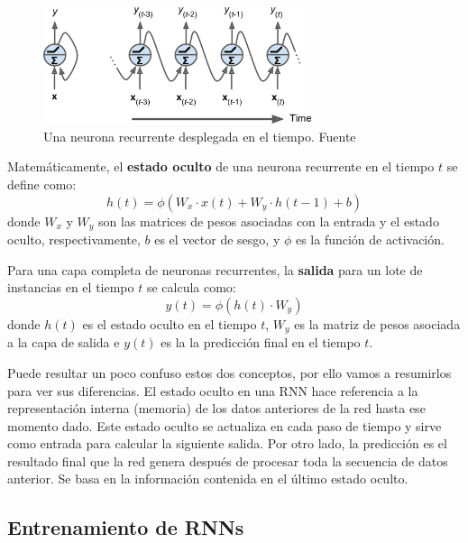 \begin{figure}[h]
    \centering
    \includegraphics[width=0.7\textwidth]{img/simple_RNN.png}
    \caption{Una neurona recurrente desplegada en el tiempo. Fuente \citep{geron2022hands}}
    \label{fig:rnn}
\end{figure}

Matemáticamente, el \textbf{estado oculto} de una neurona recurrente en el tiempo \( t \) se define como:
\begin{equation}
    h(t) = \phi ( W_x \cdot x(t) + W_y \cdot h(t-1) + b )
\end{equation}
donde \( W_x \) y \( W_y \) son las matrices de pesos asociadas con la entrada y el estado oculto, respectivamente, \( b \) es el vector de sesgo, y \( \phi \) es la función de activación.

Para una capa completa de neuronas recurrentes, la \textbf{salida} para un lote de instancias en el tiempo \( t \) se calcula como:
\begin{equation}
    y(t) = \phi(h(t) \cdot W_y)
\end{equation}
donde \( h(t) \) es el estado oculto en el tiempo $t$, $W_y$ es la matriz de pesos asociada a la capa de salida e $y(t)$ es la la predicción final en el tiempo $t$.

Puede resultar un poco confuso estos dos conceptos, por ello vamos a resumirlos para ver sus diferencias. El estado oculto en una RNN hace referencia a la representación interna (memoria) de los datos anteriores de la red hasta ese momento dado. Este estado oculto se actualiza en cada paso de tiempo y sirve como entrada para calcular la siguiente salida. Por otro lado, la predicción es el resultado final que la red genera después de procesar toda la secuencia de datos anterior. Se basa en la información contenida en el último estado oculto. 


\subsection*{Entrenamiento de RNNs}


